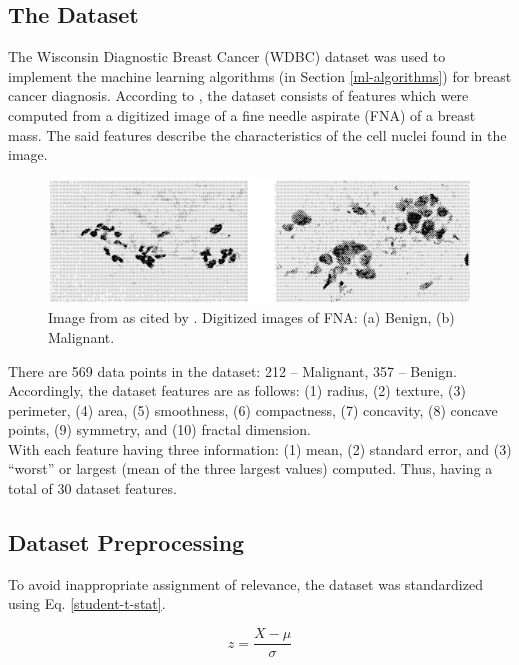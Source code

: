 \subsection{The Dataset}
The Wisconsin Diagnostic Breast Cancer (WDBC) dataset\cite{wolberg1992breast} was used to implement the machine learning algorithms (in Section \ref{ml-algorithms}) for breast cancer diagnosis. According to \cite{wolberg1992breast}, the dataset consists of features which were computed from a digitized image of a fine needle aspirate (FNA) of a breast mass. The said features describe the characteristics of the cell nuclei found in the image\cite{wolberg1992breast}.
\begin{figure}[!htb]
\centering
	\includegraphics[width=\linewidth]{fna_image.png}
	\caption{Image from \cite{wolberg1992breast} as cited by \cite{zafiropoulos2006support}. Digitized images of FNA: (a) Benign, (b) Malignant.}
	\label{training-accuracy}
\endminipage\hfill
\end{figure}

\indent	There are 569 data points in the dataset: 212 -- Malignant, 357 -- Benign. Accordingly, the dataset features are as follows: (1) radius, (2) texture, (3) perimeter, (4) area, (5) smoothness, (6) compactness, (7) concavity, (8) concave points, (9) symmetry, and (10) fractal dimension.\\
\indent	With each feature having three information\cite{wolberg1992breast}: (1) mean, (2) standard error, and (3) ``worst'' or largest (mean of the three largest values) computed. Thus, having a total of 30 dataset features.

\subsection{Dataset Preprocessing}

To avoid inappropriate assignment of relevance, the dataset was standardized using Eq. \ref{student-t-stat}.

\begin{equation}\label{student-t-stat}
z=\dfrac{X - \mu}{\sigma}
\end{equation}


